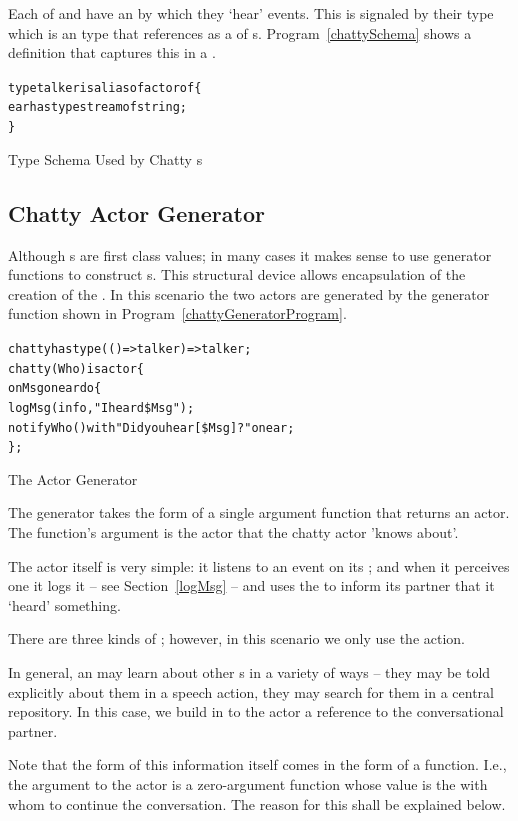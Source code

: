 Each of  and  have an  by which they `hear' events. This is signaled by their type which is an  type that references  as a  of s. Program~\vref{chattySchema} shows a   definition that captures this in a . 
\begin{program}
\begin{alltt}
type talker is alias of actor of \{
  ear has type stream of string;
\}
\end{alltt}
\caption{Type Schema Used by Chatty s}
\label{chattySchema}
\end{program}

\subsection{Chatty Actor Generator}
\label{chattyGenerator}
Although s are first class values; in many cases it makes sense to use generator functions to construct s. This structural device allows encapsulation of the creation of the . In this scenario the two actors are generated by the generator function shown in Program~\vref{chattyGeneratorProgram}.
\begin{program}
\begin{alltt}
chatty has type (()=>talker)=>talker;
chatty(Who) is actor\{
 on Msg on ear do\{
   logMsg(info,"I heard \$Msg");
   notify Who() with "Did you hear [\$Msg]?" on ear;
\};
\end{alltt}
\caption{The  Actor Generator}
\label{chattyGeneratorProgram}
\end{program}

The  generator takes the form of a single argument function that returns an actor. The function's argument is the actor that the chatty actor 'knows about'.

The  actor itself is very simple: it listens to an event on its ; and when it perceives one it logs it -- see Section~\vref{logMsg} -- and uses the   to inform its partner that it `heard' something. 

There are three kinds of ; however, in this scenario we only use the  action.

\begin{aside}
In general, an  may learn about other s in a variety of ways -- they may be told explicitly about them in a speech action, they may search for them in a central repository. In this case, we build in to the actor a reference to the conversational partner.
\begin{aside}
Note that the form of this information itself comes in the form of a function. I.e., the argument to the  actor is a zero-argument function whose value is the  with whom to continue the conversation. The reason for this shall be explained below.
\end{aside}
\end{aside}

